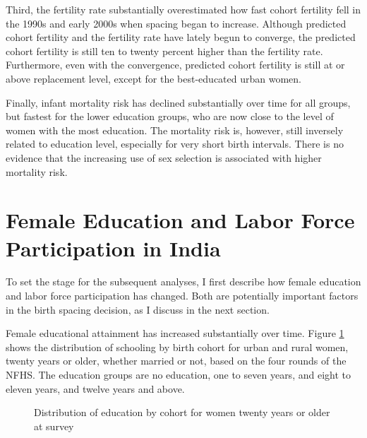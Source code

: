 \documentclass[12pt,letterpaper]{article}
\begin{document}
Third, the fertility rate substantially overestimated how fast cohort fertility fell 
in the 1990s and early 2000s when spacing began to increase.
Although predicted cohort fertility and the fertility rate have lately begun to converge,
the predicted cohort fertility is still ten to twenty percent higher than the
fertility rate.
Furthermore, even with the convergence, predicted cohort fertility is still at or above 
replacement level, except for the best-educated urban women.

Finally, infant mortality risk has declined substantially over time for all groups,
but fastest for the lower education groups, who are now close to the level of women with 
the most education.
The mortality risk is, however, still inversely related to education level, especially for 
very short birth intervals.
There is no evidence that the increasing use of sex selection is associated with higher 
mortality risk.



\section{Female Education and Labor Force Participation in India}

To set the stage for the subsequent analyses, I first describe how female education
and labor force participation has changed.
Both are potentially important factors in the birth spacing decision, as I discuss
in the next section.

Female educational attainment has increased substantially over time.
Figure \ref{fig:education_over_time} shows the distribution of schooling by birth 
cohort for urban and rural women, 
twenty years or older, whether married or not, based on the four rounds of the NFHS.
The education groups are no education, one to seven years, and eight to eleven years,
and twelve years and above.

\begin{figure}[htpb]
\centering
{} 
\caption{Distribution of education by cohort for women twenty years or older at survey}
\label{fig:education_over_time}
\end{figure}
\end{document}
